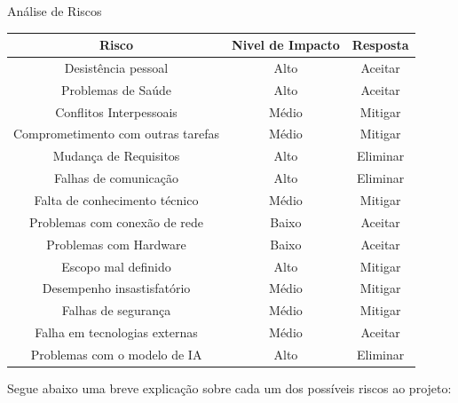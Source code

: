 \begin{quadro} [h] %
    \centering
    \caption{Análise de Riscos}\label{tab: Riscos}
      
       \begin{tabular}{|c|c|c|}
       \hline
Risco &Nivel de Impacto &Resposta \\ \hline
Desistência pessoal &Alto &Aceitar \\ \hline
Problemas de Saúde &Alto &Aceitar \\ \hline
Conflitos Interpessoais &Médio &Mitigar \\ \hline
Comprometimento com outras tarefas &Médio &Mitigar \\ \hline
Mudança de Requisitos &Alto &Eliminar \\ \hline
Falhas de comunicação &Alto &Eliminar \\ \hline
Falta de conhecimento técnico &Médio &Mitigar \\ \hline
Problemas com conexão de rede &Baixo &Aceitar \\ \hline
Problemas com Hardware &Baixo &Aceitar \\ \hline
Escopo mal definido &Alto &Mitigar \\ \hline
Desempenho insastisfatório &Médio &Mitigar \\ \hline
Falhas de segurança &Médio &Mitigar \\ \hline
Falha em tecnologias externas &Médio &Aceitar \\ \hline
Problemas com o modelo de IA &Alto &Eliminar \\ \hline

\end{tabular}

\end{quadro}


Segue abaixo uma breve explicação sobre cada um dos possíveis riscos ao projeto:

